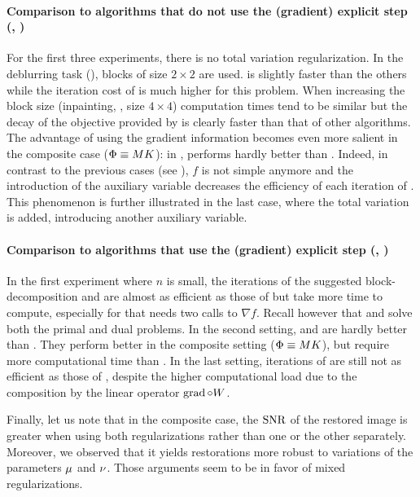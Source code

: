 \paragraph{Comparison to algorithms that do not use the (gradient) explicit step (\ChPo, \DR)} For the first three experiments, there is no total variation regularization. In the deblurring task (), blocks of size $2 \times 2$ are used. \GFB is slightly faster than the others while the iteration cost of \ChPo is much higher for this problem. When increasing the block size (inpainting, , size $4 \times 4$) computation times tend to be similar but the decay of the objective  provided by \GFB is clearly faster than that of other algorithms. The advantage of using the gradient information becomes even more salient in the composite case (\ie $\Phi \equiv M K$): in , \DR performs hardly better than \ChPo. Indeed, in contrast to the previous cases (see ), $f$ is not simple anymore and the introduction of the auxiliary variable decreases the efficiency of each iteration of \DR. This phenomenon is further illustrated in the last case, where the total variation is added, introducing another auxiliary variable.

\paragraph{Comparison to algorithms that use the (gradient) explicit step (\HPE, \CoPe)} In the first experiment where $n$ is small, the iterations of the suggested block-de\-com\-po\-si\-tion \HPE and \CoPe are almost as efficient as those of \GFB but take more time to compute, especially for \CoPe that needs two calls to $\nabla f$. Recall however that \HPE and \CoPe solve both the primal and dual problems. In the second setting, \HPE and \CoPe are hardly better than \DR. They perform better in the composite setting (\ie $\Phi \equiv M K$), but require more computational time than \GFB. In the last setting, iterations of \CoPe are still not as efficient as those of \GFB, despite the higher computational load due to the composition by the linear operator $\operatorname{grad} \circ W$. %

Finally, let us note that in the composite case, the $\mathrm{SNR}$ of the restored image is greater when using both regularizations rather than one or the other separately. Moreover, we observed that it yields restorations more robust to variations of the parameters $\mu$ and $\nu$. Those arguments seem to be in favor of mixed regularizations.

